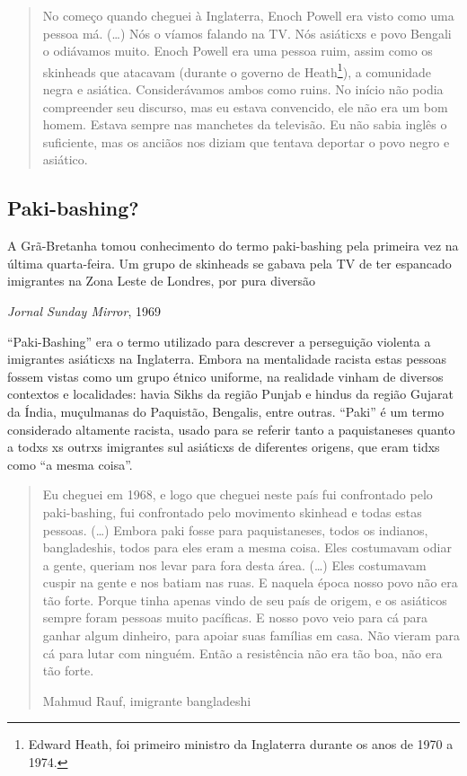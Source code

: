 \begin{quote}
No começo quando cheguei à Inglaterra, Enoch Powell era visto como uma pessoa má. (…) Nós o víamos falando na TV. Nós asiáticxs e povo Bengali o odiávamos muito. Enoch Powell era uma pessoa ruim, assim como os skinheads que atacavam (durante o governo de Heath\footnote{Edward Heath, foi primeiro ministro da Inglaterra durante os anos de 1970 a 1974.}), a comunidade negra e asiática. Considerávamos ambos como ruins. No início não podia compreender seu discurso, mas eu estava convencido, ele não era um bom homem. Estava sempre nas manchetes da televisão. Eu não sabia inglês o suficiente, mas os anciãos nos diziam que tentava deportar o povo negro e asiático.
\end{quote}

\subsection{Paki-bashing?}

\epigraph{A Grã-Bretanha tomou conhecimento do termo paki-bashing pela primeira vez na última quarta-feira. Um grupo de skinheads se gabava pela TV de ter espancado imigrantes na Zona Leste de Londres, por pura diversão}{\textit{Jornal Sunday Mirror}, 1969}

“Paki-Bashing” era o termo utilizado para descrever a perseguição violenta a imigrantes asiáticxs na Inglaterra. Embora na mentalidade racista estas pessoas fossem vistas como um grupo étnico uniforme, na realidade vinham de diversos contextos e localidades: havia Sikhs da região Punjab e hindus da região Gujarat da Índia, muçulmanas do Paquistão, Bengalis, entre outras. “Paki” é um termo considerado altamente racista, usado para se referir tanto a paquistaneses quanto a todxs xs outrxs imigrantes sul asiáticxs de diferentes origens, que eram tidxs como “a mesma coisa”.

\begin{quote}
Eu cheguei em 1968, e logo que cheguei neste país fui confrontado pelo paki-bashing, fui confrontado pelo movimento skinhead e todas estas pessoas. (…) Embora paki fosse para paquistaneses, todos os indianos, bangladeshis, todos para eles eram a mesma coisa. Eles costumavam odiar a gente, queriam nos levar para fora desta área. (…) Eles costumavam cuspir na gente e nos batiam nas ruas. E naquela época nosso povo não era tão forte. Porque tinha apenas vindo de seu país de origem, e os asiáticos sempre foram pessoas muito pacíficas. E nosso povo veio para cá para ganhar algum dinheiro, para apoiar suas famílias em casa. Não vieram para cá para lutar com ninguém. Então a resistência não era tão boa, não era tão forte.

Mahmud Rauf, imigrante bangladeshi
\end{quote}

